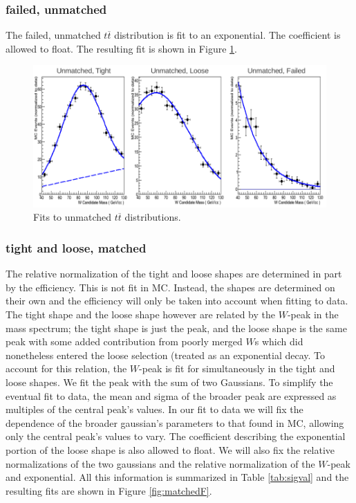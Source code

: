 \begin{}[h!]
\subsubsection*{failed, unmatched}
The failed, unmatched $t\overline{t}$ distribution is fit to an exponential. The coefficient is allowed to float. The resulting fit is shown in Figure \ref{fig:unmatchedF}.
\begin{figure}[h!]
\centering
\includegraphics[scale=0.5]{figs/WtagSF/unmatched_fits.png}
\caption{Fits to unmatched $t\overline{t}$ distributions.}\label{fig:unmatchedF}
\end{figure}
\subsubsection*{tight and loose, matched}
The relative normalization of the tight and loose shapes are determined in part by the efficiency. This is not fit in MC. Instead, the shapes are determined on their own and the efficiency will only be taken into account when fitting to data. The tight shape and the loose shape however are related by the $W$-peak in the mass spectrum; the tight shape is just the peak, and the loose shape is the same peak with some added contribution from poorly merged $W$s which did nonetheless entered the loose selection (treated as an exponential decay. To account for this relation, the $W$-peak is fit for simultaneously in the tight and loose shapes. We fit the peak with the sum of two Gaussians. To simplify the eventual fit to data, the mean and sigma of the broader peak are expressed as multiples of the central peak's values. In our fit to data we will fix the dependence of the broader gaussian's parameters to that found in MC, allowing only the central peak's values to vary. The coefficient describing the exponential portion of the loose shape is also allowed to float. We will also fix the relative normalizations of the two gaussians and the relative normalization of the $W$-peak and exponential. All this information is summarized in Table \ref{tab:sigval} and the resulting fits are shown in Figure \ref{fig:matchedF}.


\end{}
